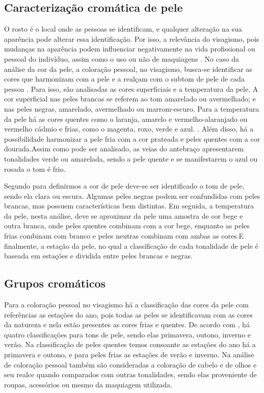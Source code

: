\subsection{Caracterização cromática de pele}
O rosto é o local onde as pessoas se identificam, e qualquer alteração na sua aparência pode alterar essa identificação. Por isso, a relevância do visagismo, pois mudanças na aparência podem influenciar negativamente na vida profissional ou pessoal do indivíduo, assim como o uso ou não de maquiagens \cite{Respostas_Emocionais_Implícitas_Julgamento_da_Atratividade_Facial_em_Faces}. No caso da análise da cor da pele, a coloração pessoal, no visagismo, busca-se identificar as cores que harmonizam com a pele e a realçam com o subtom de pele de cada
pessoa \cite{A_influencia_da_coloração_pessoal_na_autoestima_e_autoimagem}. Para isso, são analisadas as cores superficiais e a temperatura da pele. A cor superficial nas peles brancas se referem ao tom amarelado ou avermelhado; e nas peles negras, amarelado, avermelhado ou marrom-escuro. Para a temperatura da pele há as cores quentes como o laranja, amarelo e vermelho-alaranjado ou vermelho cádmio e frias, como o magenta, roxo, verde e azul. \cite{Visagismo}. Além disso, há a possibilidade harmonizar a pele fria com a cor prateada e peles quentes com a cor dourada.Assim como pode ser analisado, as veias do antebraço apresentarem tonalidades verde ou amarelada, sendo a pele  quente e se manifestarem o azul ou rosada o tom é frio. 

Segundo \cite{Visagismo} para definirmos a cor de pele deve-se ser identificado o tom de pele, sendo ela clara ou escura. Algumas peles negras podem ser confundidas com peles brancas, mas possuem características bem distintas. Em seguida, a temperatura da pele, nesta análise, deve se aproximar da pele uma amostra de cor bege e outra branca, onde peles quentes combinam com a cor bege, enquanto as peles frias combinam com branco e peles neutras combinam com ambas as cores.E finalmente, a estação da pele, no qual a classificação de cada tonalidade de pele é baseada em estações e dividida entre peles brancas e negras.

\subsection{Grupos cromáticos}
Para a coloração pessoal no visagismo há a classificação das cores da pele com referências as estações do ano, pois todas as peles se identificavam com as cores da natureza e nela estão presentes as cores frias e quentes. De acordo com \cite{Visagismo_Harmonia_e_Estetica}, há quatro classificações para tons de pele, sendo elas primavera, outono, inverno e verão. Na classificação de peles quentes temos consoante as estações do ano há a primavera e outono, e para peles frias as estações de verão e inverno. Na análise de coloração pessoal também são consideradas a coloração de cabelo e de olhos e seu realce quando comparados com outras tonalidades, sendo elas proveniente de roupas, acessórios ou mesmo da maquiagem utilizada.

